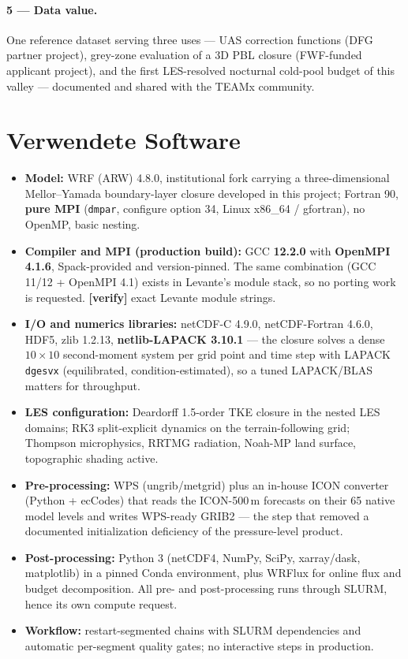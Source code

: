 \documentclass[10pt,a4paper]{article}
\newcommand{\ver}{\textbf{[verify]}}
\begin{document}
\paragraph{5 --- Data value.} One reference dataset serving three uses --- UAS
correction functions (DFG partner project), grey-zone evaluation of a 3D PBL
closure (FWF-funded applicant project), and the first LES-resolved nocturnal
cold-pool budget of this valley --- documented and shared with the TEAMx
community.

\section*{Verwendete Software}
\begin{itemize}
\item \textbf{Model:} WRF (ARW) 4.8.0, institutional fork carrying a
  three-dimensional Mellor--Yamada boundary-layer closure developed in this
  project; Fortran 90, \textbf{pure MPI} (\texttt{dmpar}, configure option 34,
  Linux x86\_64 / gfortran), no OpenMP, basic nesting.
\item \textbf{Compiler and MPI (production build):} GCC \textbf{12.2.0} with
  \textbf{OpenMPI 4.1.6}, Spack-provided and version-pinned. The same
  combination (GCC 11/12 + OpenMPI 4.1) exists in Levante's module stack, so no
  porting work is requested. \ver{} exact Levante module strings.
\item \textbf{I/O and numerics libraries:} netCDF-C 4.9.0, netCDF-Fortran
  4.6.0, HDF5, zlib 1.2.13, \textbf{netlib-LAPACK 3.10.1} --- the closure
  solves a dense $10\times10$ second-moment system per grid point and time step
  with LAPACK \texttt{dgesvx} (equilibrated, condition-estimated), so a tuned
  LAPACK/BLAS matters for throughput.
\item \textbf{LES configuration:} Deardorff 1.5-order TKE closure in the nested
  LES domains; RK3 split-explicit dynamics on the terrain-following grid;
  Thompson microphysics, RRTMG radiation, Noah-MP land surface, topographic
  shading active.
\item \textbf{Pre-processing:} WPS (ungrib/metgrid) plus an in-house ICON
  converter (Python + ecCodes) that reads the ICON-500\,m forecasts on their 65
  native model levels and writes WPS-ready GRIB2 --- the step that removed a
  documented initialization deficiency of the pressure-level product.
\item \textbf{Post-processing:} Python 3 (netCDF4, NumPy, SciPy, xarray/dask,
  matplotlib) in a pinned Conda environment, plus WRFlux for online flux and
  budget decomposition. All pre- and post-processing runs through SLURM, hence
  its own compute request.
\item \textbf{Workflow:} restart-segmented chains with SLURM dependencies and
  automatic per-segment quality gates; no interactive steps in production.
\end{itemize}
\end{document}
